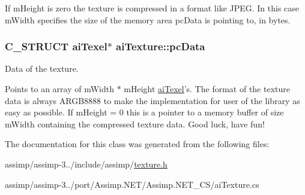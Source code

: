 If m\+Height is zero the texture is compressed in a format like J\+P\+E\+G. In this case m\+Width specifies the size of the memory area pc\+Data is pointing to, in bytes. \hypertarget{structai_texture_aeb07528748b6e49d2d81c60006024f9a}{
\subsubsection[{pc\+Data}]{\setlength{\rightskip}{0pt plus 5cm}C\+\_\+\+S\+T\+R\+U\+C\+T {\bf ai\+Texel}$\ast$ ai\+Texture\+::pc\+Data}}\label{structai_texture_aeb07528748b6e49d2d81c60006024f9a}
Data of the texture.

Points to an array of m\+Width $\ast$ m\+Height \hyperlink{structai_texel}{ai\+Texel}'s. The format of the texture data is always A\+R\+G\+B8888 to make the implementation for user of the library as easy as possible. If m\+Height = 0 this is a pointer to a memory buffer of size m\+Width containing the compressed texture data. Good luck, have fun! 

The documentation for this class was generated from the following files\+:\begin{DoxyCompactItemize}
\item 
assimp/assimp-\/3../include/assimp/\hyperlink{texture_8h}{texture.\+h}\item 
assimp/assimp-\/3../port/\+Assimp.\+N\+E\+T/\+Assimp.\+N\+E\+T\+\_\+\+C\+S/ai\+Texture.\+cs\end{DoxyCompactItemize}
